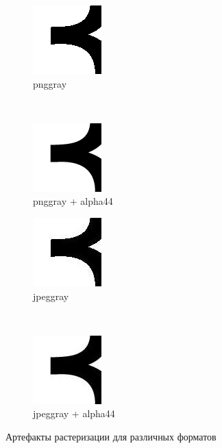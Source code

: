 \documentclass[11pt]{article}
\begin{document}
\begin{figure}[!h]
  \centering
  \begin{subfigure}[b]{0.4\textwidth}
  \centering
  \includegraphics{sample_pnggray.png}
  \caption{pnggray}\label{fig:pnggray}
  \end{subfigure}~
  \begin{subfigure}[b]{0.4\textwidth}
  \centering
  \includegraphics{sample_pnggray44.png}
  \caption{pnggray + alpha44}\label{fig:pnggray44}
  \end{subfigure}
  \begin{subfigure}[b]{0.4\textwidth}
  \centering
  \includegraphics{sample_jpeggray.jpg}
  \caption{jpeggray}\label{fig:jpeggray}
  \end{subfigure}~
  \begin{subfigure}[b]{0.4\textwidth}
  \centering
  \includegraphics{sample_jpeggray44.jpg}
  \caption{jpeggray + alpha44}\label{fig:jpeggray44}
  \end{subfigure}
  \caption{Артефакты растеризации для различных форматов}
  \label{fig:artef}
\end{figure}

\clearpage

\end{document}

